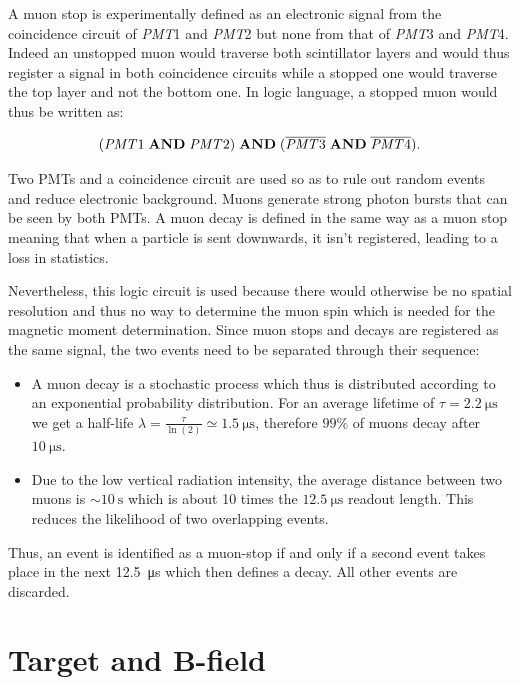 A muon stop is experimentally defined as an electronic signal from the coincidence circuit of \textit{PMT}1 and \textit{PMT}2 but none from that of \textit{PMT}3 and \textit{PMT}4. Indeed an unstopped muon would traverse both scintillator layers and would thus register a signal in both coincidence circuits while a stopped one would traverse the top layer and not the bottom one. In logic language, a stopped muon would thus be written as:

\begin{equation}
(\text{\textit{PMT}1} \;\text{\textbf{AND}} \; \text{\textit{PMT}2}) \; \text{\textbf{AND}} \; (\overline{\text{\textit{PMT}3}} \; \text{\textbf{AND}} \; \overline{\text{\textit{PMT}4}}).
\end{equation}

Two PMTs and a coincidence circuit are used so as to rule out random events and reduce electronic background. Muons generate strong photon bursts that can be seen by both PMTs. A muon decay is defined in the same way as a muon stop meaning that when a particle is sent downwards, it isn't registered, leading to a loss in statistics.

Nevertheless, this logic circuit is used because there would otherwise be no spatial resolution and thus no way to determine the muon spin which is needed for the magnetic moment determination. Since muon stops and decays are registered as the same signal, the two events need to be separated through their sequence:

\begin{itemize}
\item A muon decay is a stochastic process which thus is distributed according to an exponential probability distribution. For an average lifetime of $\tau=\SI{2.2}{\micro\second}$ we get a half-life $\lambda=\frac{\tau}{\ln(2)}\simeq \SI{1.5}{\micro\second}$, therefore $99\%$ of muons decay after $\SI{10}{\micro\second}$.
\item Due to the low vertical radiation intensity, the average distance between two muons is $\sim\SI{10}{\second}$ which is about 10 times the $\SI{12.5}{\micro\second}$ readout length. This reduces the likelihood of two overlapping events.
\end{itemize}

Thus, an event is identified as a muon-stop if and only if a second event takes place in the next \SI{12.5}{\micro\second} which then defines a decay. All other events are discarded.


\section{Target and B-field}

